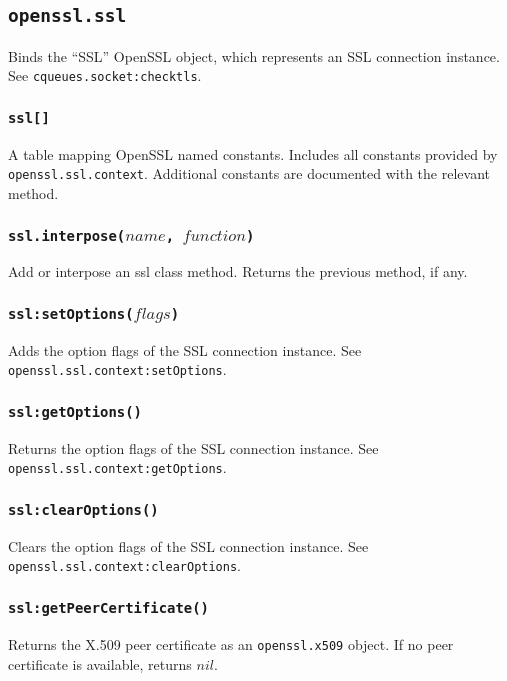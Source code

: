 \documentclass[11pt, oneside]{memoir}
\newcommand*{\fn}[1]{\texttt{#1}\xspace}
\newcommand*{\method}[1]{\texttt{#1}\xspace}
\newcommand*{\module}[1]{\texttt{#1}\xspace}
\newcounter{toccols}
\newenvironment{Module}[1]{
	\subsection{\texttt{#1}}
	\addtocontents{toc}{
		\protect\begin{multicols}{\value{toccols}}
	}
}{
	\addtocontents{toc}{\protect\end{multicols}}
}
\begin{document}
\begin{Module}{openssl.ssl}

Binds the ``SSL'' OpenSSL object, which represents an SSL connection instance. See \method{cqueues.socket:checktls}.

\subsubsection[\fn{ssl[]}]{\fn{ssl[]}}

A table mapping OpenSSL named constants. Includes all constants provided by \module{openssl.ssl.context}. Additional constants are documented with the relevant method.

\subsubsection[\fn{ssl.interpose}]{\fn{ssl.interpose($name$, $function$)}}
Add or interpose an ssl class method. Returns the previous method, if any.

\subsubsection[\fn{ssl:setOptions}]{\fn{ssl:setOptions($flags$)}}

Adds the option flags of the SSL connection instance. See \fn{openssl.ssl.context:setOptions}.

\subsubsection[\fn{ssl:getOptions}]{\fn{ssl:getOptions()}}

Returns the option flags of the SSL connection instance. See \fn{openssl.ssl.context:getOptions}.

\subsubsection[\fn{ssl:clearOptions}]{\fn{ssl:clearOptions()}}

Clears the option flags of the SSL connection instance. See \fn{openssl.ssl.context:clearOptions}.

\subsubsection[\fn{ssl:getPeerCertificate}]{\fn{ssl:getPeerCertificate()}}

Returns the X.509 peer certificate as an \module{openssl.x509} object. If no peer certificate is available, returns $nil$.


\end{Module}
\end{document}
